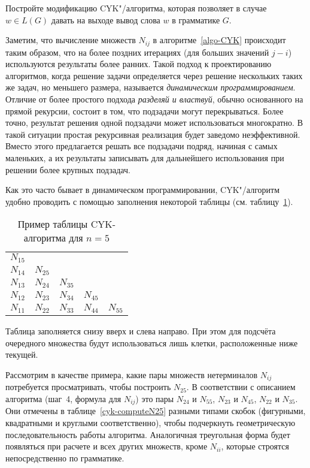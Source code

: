 \begin{myproblem} Постройте модификацию CYK"/алгоритма, которая позволяет в случае $w \in
L(G)$ давать на выходе вывод слова $w$ в грамматике $G$.
\end{myproblem}

\begin{myremark}
Заметим, что вычисление множеств $N_{ij}$ в алгоритме~\ref{algo-CYK} происходит
таким образом, что на более поздних итерациях (для больших значений $j-i$)
используются результаты более ранних. Такой подход к проектированию алгоритмов,
когда решение задачи определяется через решение нескольких таких же задач,
но меньшего размера,
называется \emph{динамическим программированием}. Отличие от более простого
подхода \emph{разделяй и властвуй}, обычно основанного на прямой рекурсии,
состоит в том, что подзадачи могут перекрываться. Более точно, результат
решения одной подзадачи может использоваться многократно. В такой ситуации
простая рекурсивная реализация будет заведомо неэффективной. Вместо этого
предлагается решать все подзадачи подряд, начиная с самых маленьких, а их
результаты записывать для дальнейшего использования при решении более
крупных подзадач.
\end{myremark}

Как это часто бывает в динамическом программировании, CYK"/алгоритм
удобно проводить с помощью заполнения некоторой таблицы
(см. таблицу~\ref{tab-cyk}).

\begin{table}[H]
\begin{center}
\begin{tabular}{|ccccc}
$N_{15}$ & & & &\\
$N_{14}$ & $N_{25}$ & & &\\
$N_{13}$ & $N_{24}$ & $N_{35}$ & &\\
$N_{12}$ & $N_{23}$ & $N_{34}$ & $N_{45}$ &\\
$N_{11}$ & $N_{22}$ & $N_{33}$ & $N_{44}$ & $N_{55}$\\
\hline
\end{tabular}
\end{center}
\caption{Пример таблицы CYK-алгоритма для $n=5$}
\label{tab-cyk}
\end{table}

\noindent Таблица заполняется снизу вверх и
слева направо. При этом для подсчёта очередного множества будут
использоваться лишь клетки, расположенные ниже текущей.

Рассмотрим в качестве примера, какие пары множеств нетерминалов $N_{ij}$ потребуется
просматривать, чтобы построить $N_{25}$. В соответствии с
описанием алгоритма (шаг~4, формула для $N_{ij}$) это пары $N_{24}$ и $N_{55}$,
$N_{23}$ и $N_{45}$,  $N_{22}$ и $N_{35}$. Они отмечены в
таблице~\ref{cyk-computeN25} разными типами скобок (фигурными,
квадратными и круглыми соответственно), чтобы подчеркнуть
геометрическую последовательность работы алгоритма. Аналогичная
треугольная форма будет появляться при расчете и всех других множеств,
кроме $N_{ii}$, которые строятся непосредственно по грамматике.

